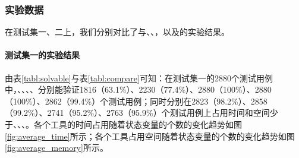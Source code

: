 
\subsubsection{实验数据}
在测试集一、二上，我们分别对比了\sctlprov{}与、\verds{}、\nusmv{}，以及\nuxmv{}的实验结果。

\paragraph{测试集一的实验结果}
由表\ref{tabl:solvable}与表\ref{tabl:compare}可知：在测试集一的2880个测试用例中，、\verds{}、\nusmv{}、\nuxmv{}、\sctlprov{}分别能验证1816（63.1\%）、2230（77.4\%）、2880（100\%）、2880（100\%）、2862（99.4\%）个测试用例；同时\sctlprov{}分别在2823（98.2\%）、2858（99.2\%）、2741（95.2\%）、2763（95.9\%）个测试用例上占用时间和空间少于、\verds{}、\nusmv{}、\nuxmv{}。各个工具的时间占用随着状态变量的个数的变化趋势如图\ref{fig:average_time}所示；各个工具占用空间随着状态变量的个数的变化趋势如图\ref{fig:average_memory}所示。


